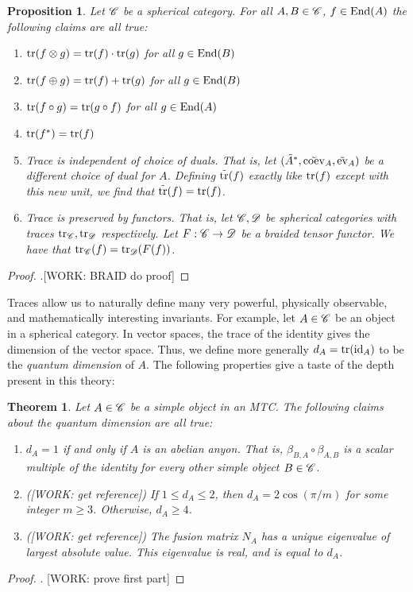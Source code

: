 \documentclass{article}
\newtheorem{theorem}{Theorem}[section]
\newtheorem{proposition}{Proposition}[section]
\theoremstyle{definition}
\numberwithin{figure}{section}
\begin{document}
\begin{proposition}\label{trace} Let $\mathscr{C}$ be a spherical category. For all $A,B\in \mathscr{C}$, $f\in \mathrm{End}(A)$ the following claims are all true:

\begin{enumerate}
\item $\mathrm{tr}(f\otimes g)=\mathrm{tr}(f)\cdot \mathrm{tr}(g)$ for all $g\in \mathrm{End}(B)$
\item $\mathrm{tr}(f\oplus g)=\mathrm{tr}(f)+\mathrm{tr}(g)$ for all $g\in \mathrm{End}(B)$
\item $\mathrm{tr}(f\circ g)=\mathrm{tr}(g\circ f)$ for all $g\in \mathrm{End}(A)$
\item $\mathrm{tr}(f^{*})=\mathrm{tr}(f)$
\item Trace is independent of choice of duals. That is, let $(\tilde{A}^*,\tilde{\mathrm{coev}}_{A}, \tilde{\mathrm{ev}}_A)$ be a different choice of dual for $A$. Defining $\tilde{\mathrm{tr}}(f)$ exactly like $\mathrm{tr}(f)$ except with this new unit, we find that $\tilde{\mathrm{tr}}(f)=\mathrm{tr}(f)$.
\item Trace is preserved by functors. That is, let $\mathscr{C},\mathscr{D}$ be spherical categories with traces $\mathrm{tr}_{\mathscr{C}},\mathrm{tr}_{\mathscr{D}}$ respectively. Let $F:\mathscr{C}\to \mathscr{D}$ be a braided tensor functor. We have that $\mathrm{tr}_{\mathscr{C}}(f)=\mathrm{tr}_{\mathscr{D}}(F(f))$.
\end{enumerate}

\end{proposition}
\begin{proof} .[WORK: BRAID do proof]
\end{proof}

Traces allow us to naturally define many very powerful, physically observable, and mathematically interesting invariants. For example, let $A\in \mathscr{C}$ be an object in a spherical category. In vector spaces, the trace of the identity gives the dimension of the vector space. Thus, we define more generally $d_A=\mathrm{tr}(\mathrm{id}_A)$ to be the \textit{quantum dimension} of $A$. The following properties give a taste of the depth present in this theory:

\begin{theorem} Let $A\in \mathscr{C}$ be a simple object in an MTC. The following claims about the quantum dimension are all true:

\begin{enumerate}

\item $d_A=1$ if and only if $A$ is an abelian anyon. That is, $\beta_{B,A}\circ \beta_{A,B}$ is a scalar multiple of the identity for every other simple object $B\in \mathscr{C}$.

\item ([WORK: get reference]) If $1\leq d_A\leq 2$, then $d_A=2\cos(\pi /m)$ for some integer $m\geq 3$. Otherwise, $d_A\geq 4$.

\item ([WORK: get reference]) The fusion matrix $N_A$ has a unique eigenvalue of largest absolute value. This eigenvalue is real, and is equal to $d_A$.
\end{enumerate}
\end{theorem}
\begin{proof}. [WORK: prove first part]
\end{proof}
\end{document}
